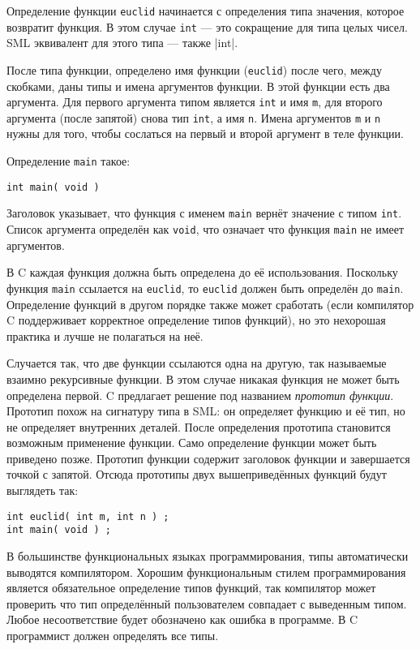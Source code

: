 Определение функции \lstinline|euclid| начинается с определения типа значения, которое возвратит функция. В этом случае \lstinline|int| --- это сокращение для типа целых чисел. SML эквивалент для этого типа --- также \inline|int|.

После типа функции, определено имя функции (\lstinline|euclid|) после чего, между скобками, даны типы и имена аргументов функции. В этой функции есть два аргумента. Для первого аргумента типом является \lstinline|int| и имя \lstinline|m|, для второго аргумента (после запятой) снова тип \lstinline|int|, а имя \lstinline|n|. Имена аргументов \lstinline|m| и \lstinline|n| нужны для того, чтобы сослаться на первый и второй аргумент в теле функции.

Определение \lstinline|main| такое:

\begin{lstlisting}
int main( void )
\end{lstlisting}

Заголовок указывает, что функция с именем \lstinline|main| вернёт значение с типом \lstinline|int|. Список аргумента определён как \lstinline|void|, что означает что функция \lstinline|main| не имеет аргументов.

В C каждая функция должна быть определена до её использования. Поскольку функция \lstinline|main| ссылается на \lstinline|euclid|, то \lstinline|euclid| должен быть определён до \lstinline|main|. Определение функций в другом порядке также может сработать (если компилятор C поддерживает корректное определение типов функций), но это нехорошая практика и лучше не полагаться на неё.

Случается так, что две функции ссылаются одна на другую, так называемые взаимно рекурсивные функции. В этом случае никакая функция не может быть определена первой. C предлагает решение под названием \emph{прототип функции}. Прототип похож на сигнатуру типа в SML: он определяет функцию и её тип, но не определяет внутренних деталей. После определения прототипа становится возможным применение функции. Само определение функции может быть приведено позже. Прототип функции содержит заголовок функции и завершается точкой с запятой. Отсюда прототипы двух вышеприведённых функций будут выглядеть так:

\begin{lstlisting}
int euclid( int m, int n ) ;
int main( void ) ;
\end{lstlisting}

В большинстве функциональных языках программирования, типы автоматически выводятся компилятором. Хорошим функциональным стилем программирования является обязательное определение типов функций, так компилятор может проверить что тип определённый пользователем совпадает с выведенным типом. Любое несоответствие будет обозначено как ошибка в программе. В C программист должен определять все типы.

